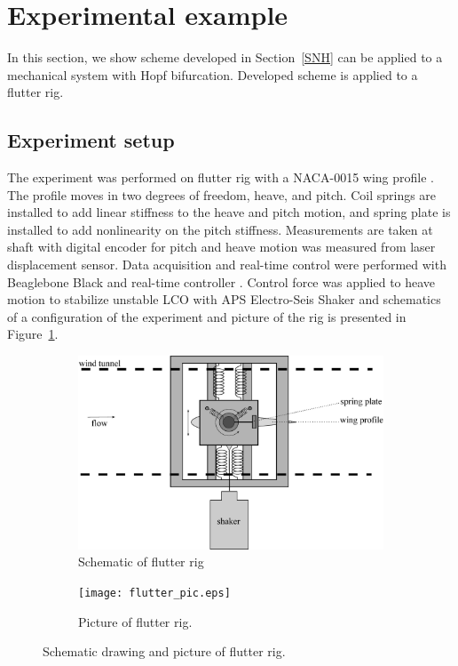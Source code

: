 \documentclass[openacc]{rsproca_new}%
\newcommand{\Sref}[1]{Section~\ref{#1}}
\newcommand{\Fref}[1]{Figure~\ref{#1}}
\begin{document}
\section{Experimental example}
In this section, we show scheme developed in \Sref{SNH} can be applied to a mechanical system with Hopf bifurcation. Developed scheme is applied to a flutter rig.


\subsection{Experiment setup}\label{setup}
The experiment was performed on flutter rig with a NACA-0015 wing profile \cite{jacobs1933characteristics}. The profile moves in two degrees of freedom, heave, and pitch. Coil springs are installed to add linear stiffness to the heave and pitch motion, and spring plate is installed to add nonlinearity on the pitch stiffness. Measurements are taken at shaft with digital encoder for pitch and heave motion was measured from laser displacement sensor. Data acquisition and real-time control were performed with Beaglebone Black and real-time controller \cite{rtc2}. Control force was applied to heave motion to stabilize unstable LCO with APS Electro-Seis Shaker and schematics of a configuration of the experiment and picture of the rig is presented in \Fref{f:rig}.

\begin{figure}
  \centering
  \begin{subfigure}[b]{0.6\linewidth}
    \includegraphics[width=\linewidth]{flutter_rig.eps}
    \caption{Schematic of flutter rig}
  \end{subfigure}
  \begin{subfigure}[b]{0.6\linewidth}
    \texttt{[image: flutter\_pic.eps]}
    \caption{Picture of flutter rig.}
  \end{subfigure}
  \caption{Schematic drawing and picture of flutter rig.}
  \label{f:rig}
\end{figure}
\end{document}
